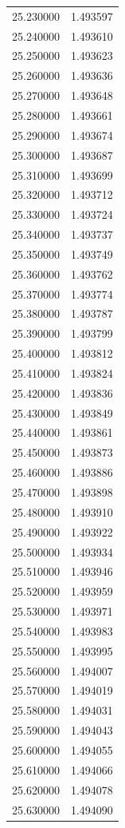 \begin{tabular}{rr}
25.230000 & 1.493597 \\
25.240000 & 1.493610 \\
25.250000 & 1.493623 \\
25.260000 & 1.493636 \\
25.270000 & 1.493648 \\
25.280000 & 1.493661 \\
25.290000 & 1.493674 \\
25.300000 & 1.493687 \\
25.310000 & 1.493699 \\
25.320000 & 1.493712 \\
25.330000 & 1.493724 \\
25.340000 & 1.493737 \\
25.350000 & 1.493749 \\
25.360000 & 1.493762 \\
25.370000 & 1.493774 \\
25.380000 & 1.493787 \\
25.390000 & 1.493799 \\
25.400000 & 1.493812 \\
25.410000 & 1.493824 \\
25.420000 & 1.493836 \\
25.430000 & 1.493849 \\
25.440000 & 1.493861 \\
25.450000 & 1.493873 \\
25.460000 & 1.493886 \\
25.470000 & 1.493898 \\
25.480000 & 1.493910 \\
25.490000 & 1.493922 \\
25.500000 & 1.493934 \\
25.510000 & 1.493946 \\
25.520000 & 1.493959 \\
25.530000 & 1.493971 \\
25.540000 & 1.493983 \\
25.550000 & 1.493995 \\
25.560000 & 1.494007 \\
25.570000 & 1.494019 \\
25.580000 & 1.494031 \\
25.590000 & 1.494043 \\
25.600000 & 1.494055 \\
25.610000 & 1.494066 \\
25.620000 & 1.494078 \\
25.630000 & 1.494090 \\

\end{tabular}
